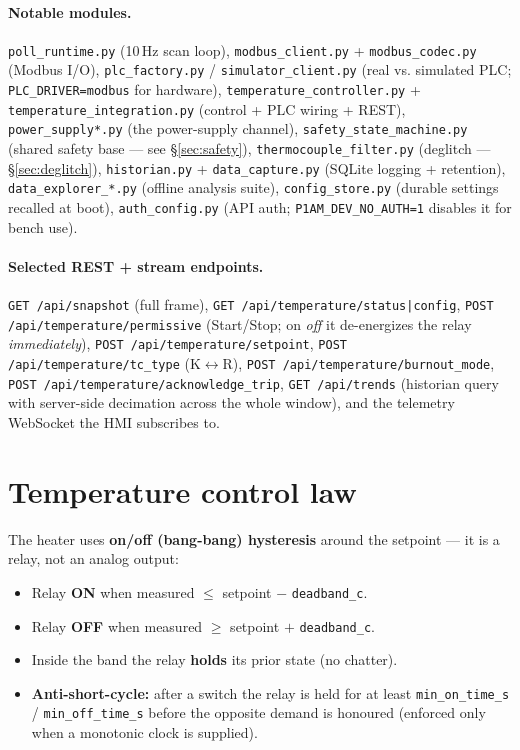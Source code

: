 \documentclass[11pt]{article}
\newcommand{\code}[1]{\texttt{#1}}
\begin{document}
\paragraph{Notable modules.}
\code{poll\_runtime.py} (10\,Hz scan loop), \code{modbus\_client.py} +
\code{modbus\_codec.py} (Modbus I/O), \code{plc\_factory.py} /
\code{simulator\_client.py} (real vs. simulated PLC; \code{PLC\_DRIVER=modbus} for
hardware), \code{temperature\_controller.py} + \code{temperature\_integration.py}
(control + PLC wiring + REST), \code{power\_supply*.py} (the power-supply channel),
\code{safety\_state\_machine.py} (shared safety base --- see \S\ref{sec:safety}),
\code{thermocouple\_filter.py} (deglitch --- \S\ref{sec:deglitch}),
\code{historian.py} + \code{data\_capture.py} (SQLite logging + retention),
\code{data\_explorer\_*.py} (offline analysis suite), \code{config\_store.py}
(durable settings recalled at boot), \code{auth\_config.py} (API auth;
\code{P1AM\_DEV\_NO\_AUTH=1} disables it for bench use).

\paragraph{Selected REST + stream endpoints.}
\code{GET /api/snapshot} (full frame), \code{GET /api/temperature/status|config},
\code{POST /api/temperature/permissive} (Start/Stop; on \emph{off} it de-energizes
the relay \emph{immediately}), \code{POST /api/temperature/setpoint},
\code{POST /api/temperature/tc\_type} (K$\leftrightarrow$R),
\code{POST /api/temperature/burnout\_mode}, \code{POST /api/temperature/acknowledge\_trip},
\code{GET /api/trends} (historian query with server-side decimation across the
whole window), and the telemetry WebSocket the HMI subscribes to.

\section{Temperature control law}
The heater uses \textbf{on/off (bang-bang) hysteresis} around the setpoint --- it
is a relay, not an analog output:

\begin{itemize}[nosep]
  \item Relay \textbf{ON} when measured $\le$ setpoint $-$ \code{deadband\_c}.
  \item Relay \textbf{OFF} when measured $\ge$ setpoint $+$ \code{deadband\_c}.
  \item Inside the band the relay \textbf{holds} its prior state (no chatter).
  \item \textbf{Anti-short-cycle:} after a switch the relay is held for at least
        \code{min\_on\_time\_s} / \code{min\_off\_time\_s} before the opposite
        demand is honoured (enforced only when a monotonic clock is supplied).
\end{itemize}
\end{document}
